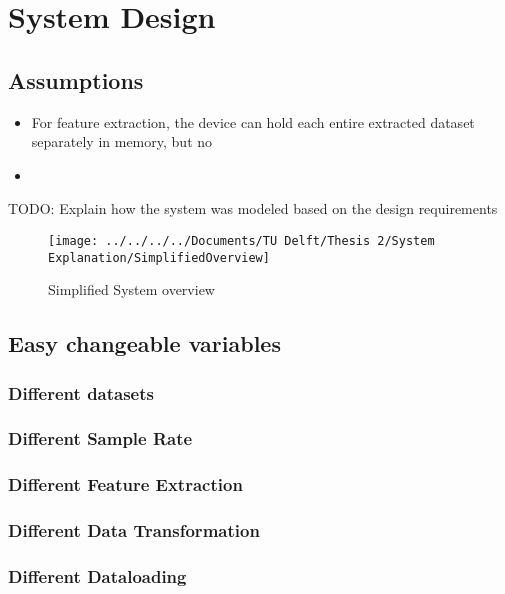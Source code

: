 \chapter{System Design}

\section{Assumptions}

\begin{itemize}
	\item For feature extraction, the device can hold each entire extracted dataset separately in memory, but no 
	\item 
\end{itemize}


TODO: Explain how the system was modeled based on the design requirements

\begin{figure}[h]
	\centering
	\texttt{[image: ../../../../Documents/TU Delft/Thesis 2/System Explanation/SimplifiedOverview]}
	\caption{Simplified System overview}
\end{figure}


\section{Easy changeable variables}

\subsection{Different datasets}

\subsection{Different Sample Rate}

\subsection{Different Feature Extraction}

\subsection{Different Data Transformation}

\subsection{Different Dataloading}

